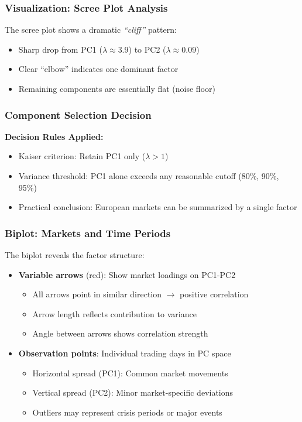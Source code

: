 \documentclass[aspectratio=169]{beamer}
\begin{document}
\begin{frame}
    \frametitle{Visualization: Scree Plot Analysis}
    The scree plot shows a dramatic \textit{``cliff''} pattern:
    \begin{itemize}
        \item Sharp drop from PC1 ($\lambda \approx 3.9$) to PC2 ($\lambda \approx 0.09$) \pause
        \item Clear ``elbow'' indicates one dominant factor \pause
        \item Remaining components are essentially flat (noise floor) \pause
    \end{itemize}
\end{frame}

\begin{frame}
    \frametitle{Component Selection Decision}
    \textbf{Decision Rules Applied:}
    \begin{itemize}
        \item Kaiser criterion: Retain PC1 only ($\lambda > 1$) \pause
        \item Variance threshold: PC1 alone exceeds any reasonable cutoff (80\%, 90\%, 95\%) \pause
        \item Practical conclusion: European markets can be summarized by a single factor \pause
    \end{itemize}
\end{frame}

\begin{frame}
    \frametitle{Biplot: Markets and Time Periods}
    The biplot reveals the factor structure:
    \begin{itemize}
        \item \textbf{Variable arrows} (red): Show market loadings on PC1-PC2 \pause
              \begin{itemize}
                  \item All arrows point in similar direction $\rightarrow$ positive correlation \pause
                  \item Arrow length reflects contribution to variance \pause
                  \item Angle between arrows shows correlation strength \pause
              \end{itemize}
        \item \textbf{Observation points}: Individual trading days in PC space \pause
              \begin{itemize}
                  \item Horizontal spread (PC1): Common market movements \pause
                  \item Vertical spread (PC2): Minor market-specific deviations \pause
                  \item Outliers may represent crisis periods or major events \pause
              \end{itemize}
    \end{itemize}
\end{frame}
\end{document}
